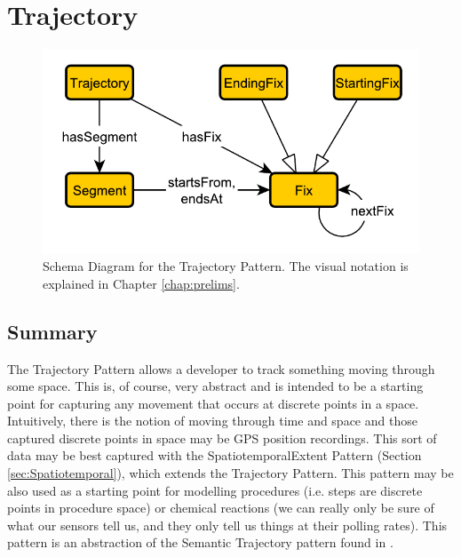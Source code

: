 \section{Trajectory}
\label{sec:Trajectory}
\begin{figure}[h!]
\begin{center}
\includegraphics[width=.8\textwidth]{figures/trajectory}
\end{center}
\caption{Schema Diagram for the Trajectory Pattern. The visual notation is explained in Chapter \ref{chap:prelims}.}
\label{fig:Spatiotemporal}
\label{fig:Trajectory}
\end{figure}
\subsection{Summary}
\label{sum:Trajectory}
The \textsf{Trajectory} Pattern allows a developer to track something moving through some space. This is, of course, very abstract and is intended to be a starting point for capturing any movement that occurs at discrete points in a space. Intuitively, there is the notion of moving through time and space and those captured discrete points in space may be GPS position recordings. This sort of data may be best captured with the \textsf{SpatiotemporalExtent} Pattern (Section \ref{sec:Spatiotemporal}), which extends the \textsf{Trajectory} Pattern. This pattern may be also used as a starting point for modelling procedures (i.e. steps are discrete points in procedure space) or chemical reactions (we can really only be sure of what our sensors tell us, and they only tell us things at their polling rates). This pattern is an abstraction of the Semantic Trajectory pattern found in \cite{traj}.

